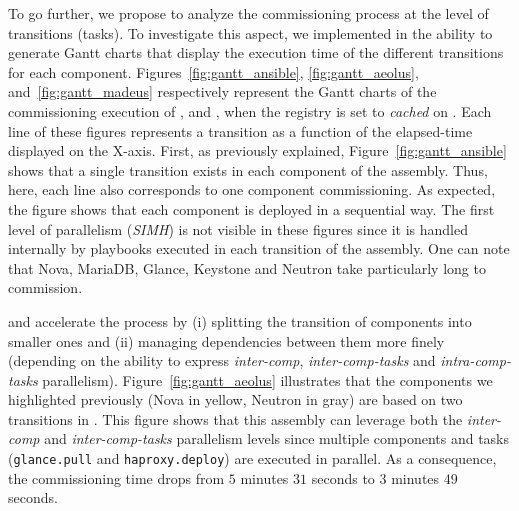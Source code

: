 To go further, we propose to analyze the
commissioning process at the level of transitions (\ie tasks). To
investigate this aspect, we implemented in \mad the ability to
generate Gantt charts that display the execution time of the different
transitions for each component.
Figures~\ref{fig:gantt_ansible}, \ref{fig:gantt_aeolus},
and~\ref{fig:gantt_madeus} respectively represent the Gantt charts of
the commissioning execution of \ansass, \aeoass and \madass, when the
registry is set to \emph{cached} on \ecotype. Each line of these
figures represents a transition as a function of the elapsed-time
displayed on the X-axis.  First, as previously explained,
Figure~\ref{fig:gantt_ansible} shows that a single transition exists
in each component of the \ansass assembly. Thus, here, each line also
corresponds to one component commissioning. As expected, the figure
shows that each component is deployed in a sequential way. The first
level of parallelism (\ie \emph{SIMH}) is not visible in these figures
since it is handled internally by \ansible playbooks executed in each
transition of the assembly. One can note that Nova, MariaDB, Glance,
Keystone and Neutron take particularly long to commission. 

\aeoass and \madass accelerate the process by (i) splitting the
transition of components into smaller ones and (ii) managing
dependencies between them more finely (depending on the ability to express
\emph{inter-comp}, \emph{inter-comp-tasks} and \emph{intra-comp-tasks}
parallelism).
%
Figure~\ref{fig:gantt_aeolus} illustrates that the components we
highlighted previously (\eg Nova in yellow, Neutron in gray) are based
on two transitions in \aeoass. This figure shows that this assembly
can leverage both the \emph{inter-comp} and \emph{inter-comp-tasks}
parallelism levels since multiple components and
tasks (\eg \texttt{glance.pull} and
\texttt{haproxy.deploy}) are executed in parallel. As a consequence,
the commissioning time drops from $5$ minutes $31$ seconds to $3$
minutes $49$ seconds.

